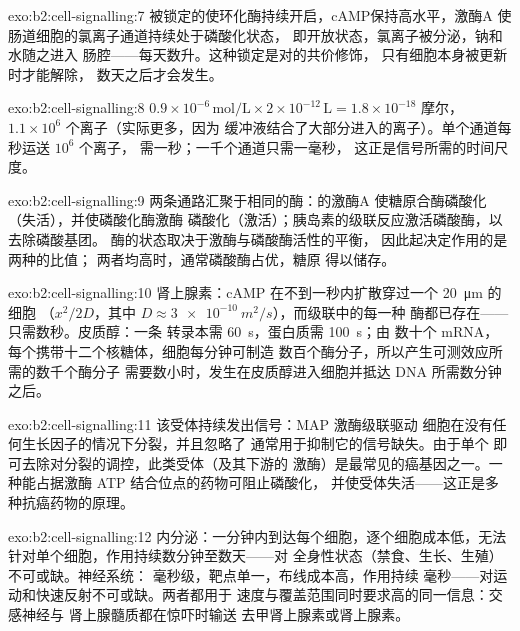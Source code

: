 \begin{solution}{exo:b2:cell-signalling:7}
被锁定的使环化酶持续开启，cAMP保持高水平，激酶A
使肠道细胞的氯离子通道持续处于磷酸化状态，
即开放状态，氯离子被分泌，钠和水随之进入
肠腔——每天数升。这种锁定是对的共价修饰，
只有细胞本身被更新时才能解除，
数天之后才会发生。
\end{solution}

\begin{solution}{exo:b2:cell-signalling:8}
$0.9\times 10^{-6}\,\text{mol/L}\times 2\times 10^{-12}\,\text{L} =
1.8\times 10^{-18}$ 摩尔，$1.1\times 10^{6}$ 个离子（实际更多，因为
缓冲液结合了大部分进入的离子）。单个通道每秒运送 $10^{6}$ 个离子，
需一秒；一千个通道只需一毫秒，
这正是信号所需的时间尺度。
\end{solution}

\begin{solution}{exo:b2:cell-signalling:9}
两条通路汇聚于相同的酶：的激酶A
使糖原合酶磷酸化（失活），并使磷酸化酶激酶
磷酸化（激活）；胰岛素的级联反应激活磷酸酶，以去除磷酸基团。
酶的状态取决于激酶与磷酸酶活性的平衡，
因此起决定作用的是两种的比值；
两者均高时，通常磷酸酶占优，糖原
得以储存。
\end{solution}

\begin{solution}{exo:b2:cell-signalling:10}
肾上腺素：cAMP 在不到一秒内扩散穿过一个 \qty{20}{\micro m} 的细胞
（$x^{2}/2D$，其中 $D \approx \qty{3e-10}{m^2/s}$），而级联中的每一种
酶都已存在——只需数秒。皮质醇：一条
转录本需 \qty{60}{s}，蛋白质需 \qty{100}{s}；由
数十个 mRNA，每个携带十二个核糖体，细胞每分钟可制造
数百个酶分子，所以产生可测效应所需的数千个酶分子
需要数小时，发生在皮质醇进入细胞并抵达 DNA
所需数分钟之后。
\end{solution}

\begin{solution}{exo:b2:cell-signalling:11}
该受体持续发出信号：MAP 激酶级联驱动
细胞在没有任何生长因子的情况下分裂，并且忽略了
通常用于抑制它的信号缺失。由于单个
即可去除对分裂的调控，此类受体（及其下游的
激酶）是最常见的癌基因之一。一种能占据激酶
ATP 结合位点的药物可阻止磷酸化，
并使受体失活——这正是多种抗癌药物的原理。
\end{solution}

\begin{solution}{exo:b2:cell-signalling:12}
内分泌：一分钟内到达每个细胞，逐个细胞成本低，无法
针对单个细胞，作用持续数分钟至数天——对
全身性状态（禁食、生长、生殖）不可或缺。神经系统：
毫秒级，靶点单一，布线成本高，作用持续
毫秒——对运动和快速反射不可或缺。两者都用于
速度与覆盖范围同时要求高的同一信息：交感神经与
肾上腺髓质都在惊吓时输送
去甲肾上腺素或肾上腺素。
\end{solution}

